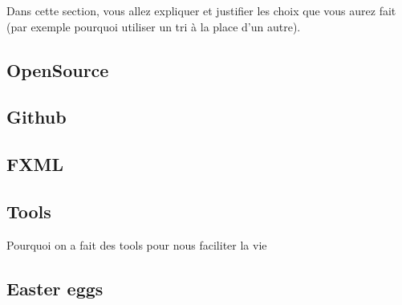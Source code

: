 \documentclass[../main.tex]{subfiles}
\begin{document}
Dans cette section, vous allez expliquer et justifier les choix que vous aurez fait (par exemple pourquoi utiliser un tri à la place d'un autre).

\subsection{OpenSource}

\subsection{Github}

\subsection{FXML}

\subsection{Tools}
Pourquoi on a fait des tools pour nous faciliter la vie

\subsection{Easter eggs}
\end{document}
